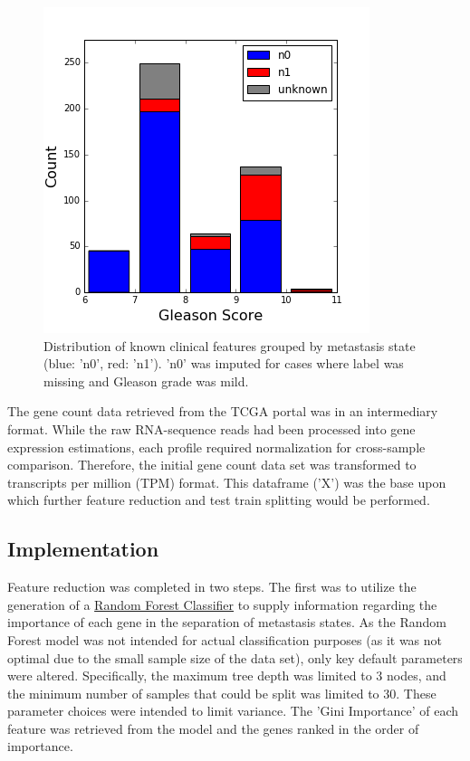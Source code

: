\documentclass[final]{article}
\begin{document}
\begin{figure}
  \centering
  \includegraphics[scale=0.5]{GleasonHist2}
  \caption{Distribution of known clinical features grouped by metastasis state (blue: 'n0', red: 'n1').\label{fig:postGSHist}
  'n0' was imputed for cases where label was missing and Gleason grade was mild.}
\end{figure}

The gene count data retrieved from the TCGA portal was in an intermediary
format.  While the raw RNA-sequence reads had been processed into gene
expression estimations, each profile required normalization for
cross-sample comparison.   Therefore, the initial gene count data set was transformed to
transcripts per million (TPM) format.  This dataframe ('X') was the base upon
which further feature reduction and test train splitting would be performed.

\subsection{Implementation}

Feature reduction was completed in two steps.  The first was to utilize the
generation of a
\href{http://scikit-learn.org/stable/modules/generated/sklearn.ensemble.RandomForestClassifier.html#sklearn.ensemble.RandomForestClassifier}{Random
Forest Classifier} to supply information regarding the importance of each gene
in the separation of metastasis states.  As the Random Forest model was not
intended for actual classification purposes (as it was not optimal due to the small sample
size of the data set), only key default parameters were altered. Specifically,
the maximum tree depth was limited to 3 nodes, and the minimum number of samples
that could be split was limited to 30.  These parameter choices were intended to
limit variance.  The 'Gini Importance' of each feature was retrieved from the
model and the genes ranked in the order of importance.
\end{document}
